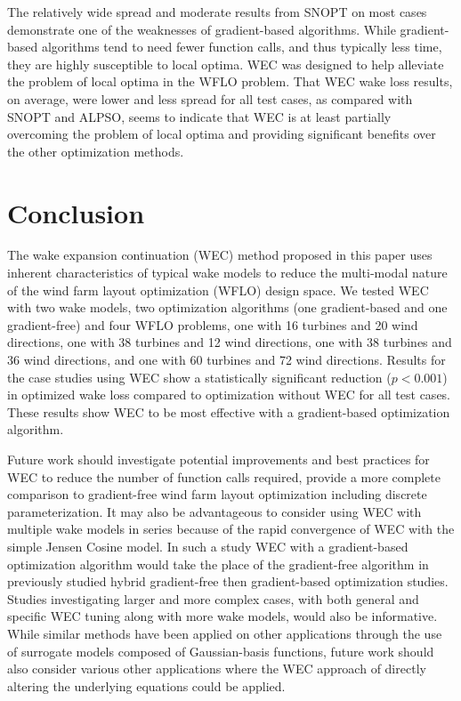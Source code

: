 \documentclass{jpconf}
\begin{document}
The relatively wide spread and moderate results from SNOPT on most cases demonstrate one of the weaknesses of gradient-based algorithms. While gradient-based algorithms tend to need fewer function calls, and thus typically less time, they are highly susceptible to local optima. WEC was designed to help alleviate the problem of local optima in the WFLO problem. That WEC wake loss results, on average, were lower and less spread for all test cases, as compared with SNOPT and ALPSO, seems to indicate that WEC is at least partially overcoming the problem of local optima and providing significant benefits over the other optimization methods.

\section{Conclusion}
The wake expansion continuation (WEC) method proposed in this paper uses inherent characteristics of typical wake models to reduce the multi-modal nature of the wind farm layout optimization (WFLO) design space. We tested WEC with two wake models, two optimization algorithms (one gradient-based and one gradient-free) and four WFLO problems, one with 16 turbines and 20 wind directions, one with 38 turbines and 12 wind directions, one with 38 turbines and 36 wind directions, and one with 60 turbines and 72 wind directions. Results for the case studies using WEC show a statistically significant reduction  ($p<0.001$) in optimized wake loss compared to optimization without WEC for all test cases. These results show WEC to be most effective with a gradient-based optimization algorithm.

Future work should investigate potential improvements and best practices for WEC to reduce the number of function calls required, provide a more complete comparison to gradient-free wind farm layout optimization including discrete parameterization. It may also be advantageous to consider using WEC with multiple wake models in series because of the rapid convergence of WEC with the simple Jensen Cosine model. In such a study WEC with a gradient-based optimization algorithm would take the place of the gradient-free algorithm in previously studied hybrid gradient-free then gradient-based optimization studies. Studies investigating larger and more complex cases, with both general and specific WEC tuning along with more wake models, would also be informative. While similar methods have been applied on other applications through the use of surrogate models composed of Gaussian-basis functions, future work should also consider various other applications where the WEC approach of directly altering the underlying equations could be applied.
\end{document}
